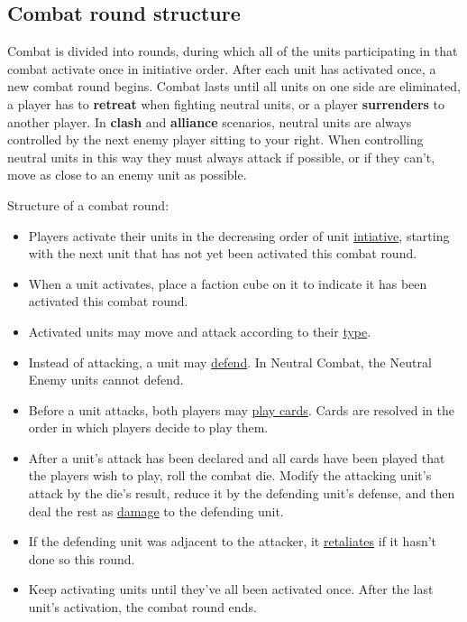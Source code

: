\subsection*{Combat round structure}
Combat is divided into rounds, during which all of the units participating in that combat activate once in initiative order.
After each unit has activated once, a new combat round begins.
Combat lasts until all units on one side are eliminated, a player has to \textbf{retreat} when fighting neutral units, or a player \textbf{surrenders} to another player.
In \textbf{clash} and \textbf{alliance} scenarios, neutral units are always controlled by the next enemy player sitting to your right.
When controlling neutral units in this way they must always attack if possible, or if they can't, move as close to an enemy unit as possible.\par
Structure of a combat round:
\begin{itemize}
  \item Players activate their units in the decreasing order of unit \hyperlink{Initiative}{intiative}, starting with the next unit that has not yet been activated this combat round.
  \item When a unit activates, place a faction cube on it to indicate it has been activated this combat round.
  \item Activated units may move and attack according to their \hyperlink{Unittype}{type}.
  \item Instead of attacking, a unit may \hyperlink{Defend}{defend}.
  In Neutral Combat, the Neutral Enemy units cannot defend.
  \item Before a unit attacks, both players may \hyperlink{CombatCards}{play cards}. Cards are resolved in the order in which players decide to play them.
  \item After a unit's attack has been declared and all cards have been played that the players wish to play, roll the combat die.
    Modify the attacking unit's attack by the die's result, reduce it by the defending unit's defense, and then deal the rest as \hyperlink{HP}{damage} to the defending unit.
  \item If the defending unit was adjacent to the attacker, it \hyperlink{Retaliate}{retaliates} if it hasn't done so this round.
  \item Keep activating units until they've all been activated once.
After the last unit's activation, the combat round ends.
\end{itemize}
